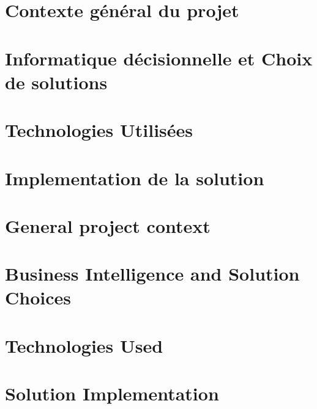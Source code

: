 \documentclass{iid}
\begin{document}


\setcounter{page}{1}
\ifnum{}
    
\else
    
\fi
\ifnum{}
\else
\fi
\fancyhead[L]{\tiny \leftmark}
\fancyhead[R]{\scriptsize \rightmark}
\fancyfoot[C]{\thepage}


\ifnum{}
    \chapter{Contexte général du projet}\label{chap:1}
    \minitoc
    
    \chapter{Informatique décisionnelle et Choix de solutions}\label{chap:2}
    

    \chapter{Technologies Utilisées}\label{chap:3}
    

    \chapter{Implementation de la solution}\label{chap:4}
    

\else
    \chapter{General project context}\label{chap:1}
    

    \chapter{Business Intelligence and Solution Choices}\label{chap:2}
    

    \chapter{Technologies Used}\label{chap:3}
    

    \chapter{Solution Implementation}\label{chap:4}
    
\fi
 
% 
\ifnum{}
    
\else
    
\fi
% 
\lhead[]{} \rhead[]{} \chead[]{}

% 
% 


%
\end{document}
